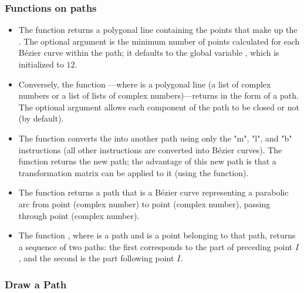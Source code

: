 \subsubsection{Functions on paths}

\begin{itemize}
    \item The function  returns a polygonal line containing the points that make up the . The optional argument  is the minimum number of points calculated for each Bézier curve within the path; it defaults to the global variable , which is initialized to $12$. 

    \item Conversely, the function —where  is a polygonal line (a list of complex numbers or a list of lists of complex numbers)—returns  in the form of a path. The optional argument  allows each component of the path to be closed or not (\false by default).

    \item The function  converts the  into another path using only the "m", "l", and "b" instructions (all other instructions are converted into Bézier curves). The function returns the new path; the advantage of this new path is that a transformation matrix can be applied to it (using the  function).
    
    \item The function  returns a path that is a Bézier curve representing a parabolic arc from point  (complex number) to point  (complex number), passing through point  (complex number).
    
    \item The function , where  is a path and  is a point belonging to that path, returns a sequence of two paths: the first corresponds to the part of  preceding point $I$, and the second is the part following point $I$.    
\end{itemize}


\subsubsection{Draw a Path}

